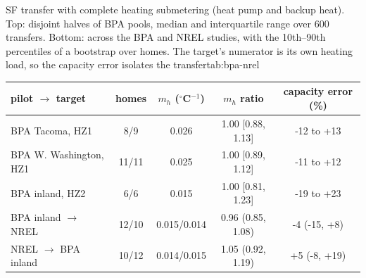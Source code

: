 \begin{autotable}{SF transfer with complete heating submetering (heat pump and backup heat). Top: disjoint halves of BPA pools, median and interquartile range over 600 transfers. Bottom: across the BPA and NREL studies, with the 10th--90th percentiles of a bootstrap over homes. The target's numerator is its own heating load, so the capacity error isolates the transfer}{tab:bpa-nrel}
\setlength{\tabcolsep}{3pt}
\begin{tabular}{lcccc}
\toprule
pilot $\rightarrow$ target & homes & $m_h$ ($^\circ$C$^{-1}$) & $m_h$ ratio & capacity error (\%) \\
\midrule
BPA Tacoma, HZ1 & 8/9 & 0.026 & 1.00 [0.88, 1.13] & -12 to +13 \\
BPA W. Washington, HZ1 & 11/11 & 0.025 & 1.00 [0.89, 1.12] & -11 to +12 \\
BPA inland, HZ2 & 6/6 & 0.015 & 1.00 [0.81, 1.23] & -19 to +23 \\
\midrule
BPA inland $\rightarrow$ NREL & 12/10 & 0.015/0.014 & 0.96 (0.85, 1.08) & -4 (-15, +8) \\
NREL $\rightarrow$ BPA inland & 10/12 & 0.014/0.015 & 1.05 (0.92, 1.19) & +5 (-8, +19) \\
\bottomrule
\end{tabular}
\end{autotable}